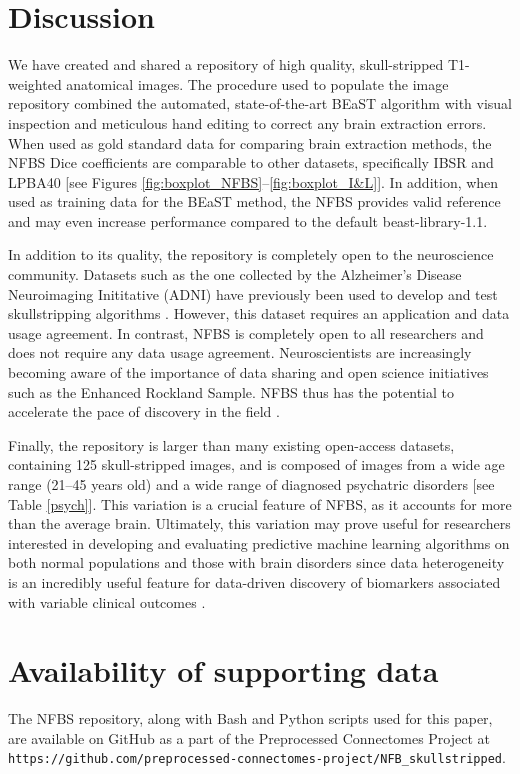 \documentclass{bmcart}
\begin{document}
\section*{Discussion}
We have created and shared a repository of high quality, skull-stripped T1-weighted anatomical images. The procedure used to populate the image repository combined the automated, state-of-the-art BEaST algorithm with visual inspection and meticulous hand editing to correct any brain extraction errors. When used as gold standard data for comparing brain extraction methods, the NFBS Dice coefficients are comparable to other datasets, specifically IBSR and LPBA40 [see Figures \ref{fig:boxplot_NFBS}--\ref{fig:boxplot_I&L}]. In addition, when used as training data for the BEaST method, the NFBS provides valid reference and may even increase performance compared to the default beast-library-1.1. 

In addition to its quality, the repository is completely open to the neuroscience community. Datasets such as the one collected by the Alzheimer's Disease Neuroimaging Inititative (ADNI) \cite{pmid17476317} have previously been used to develop and test skullstripping algorithms \cite{pmid21195780}. However, this dataset requires an application and data usage agreement. In contrast, NFBS is completely open to all researchers and does not require any data usage agreement. Neuroscientists are increasingly becoming aware of the importance of data sharing and open science initiatives such as the Enhanced Rockland Sample. NFBS thus has the potential to accelerate the pace of discovery in the field \cite{Nichols054262}.

Finally, the repository is larger than many existing open-access datasets, containing 125 skull-stripped images, and is composed of images from a wide age range (21--45 years old) and a wide range of diagnosed psychatric disorders [see Table \ref{psych}]. This variation is a crucial feature of NFBS, as it accounts for more than the average brain. Ultimately, this variation may prove useful for researchers interested in developing and evaluating predictive machine learning algorithms on both normal populations and those with brain disorders since data heterogeneity is an incredibly useful feature for data-driven discovery of biomarkers associated with variable clinical outcomes \cite{gabrieli2015prediction}.

\section*{Availability of supporting data}
The NFBS repository, along with Bash and Python scripts used for this paper, are available on GitHub as a part of the Preprocessed Connectomes Project \cite{Github} at {\tt https://github.com/preprocessed-connectomes-project/NFB\_skullstripped}.
\end{document}
